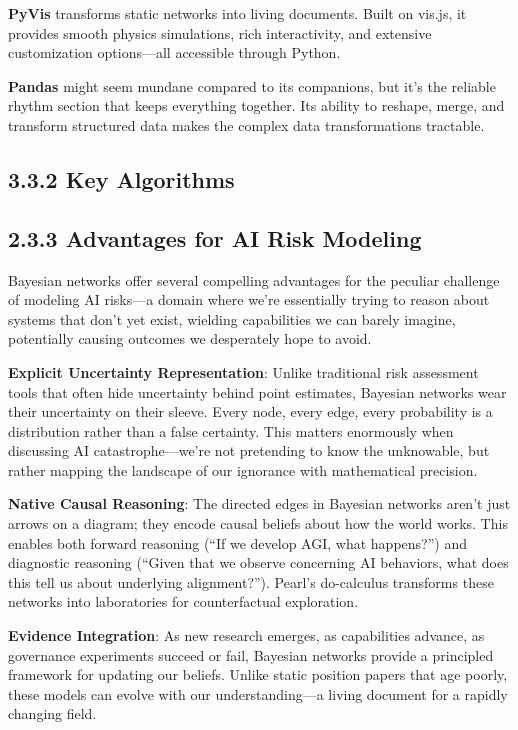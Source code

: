 \documentclass[
  11pt,
  letterpaper,
]{book}
\begin{document}
\textbf{PyVis} transforms static networks into living documents. Built
on vis.js, it provides smooth physics simulations, rich interactivity,
and extensive customization options---all accessible through Python.

\textbf{Pandas} might seem mundane compared to its companions, but it's
the reliable rhythm section that keeps everything together. Its ability
to reshape, merge, and transform structured data makes the complex data
transformations tractable.

\subsection{3.3.2 Key Algorithms}\label{sec-key-algorithms}

\subsection{2.3.3 Advantages for AI Risk
Modeling}\label{sec-modeling-advantages}

Bayesian networks offer several compelling advantages for the peculiar
challenge of modeling AI risks---a domain where we're essentially trying
to reason about systems that don't yet exist, wielding capabilities we
can barely imagine, potentially causing outcomes we desperately hope to
avoid.

\textbf{Explicit Uncertainty Representation}: Unlike traditional risk
assessment tools that often hide uncertainty behind point estimates,
Bayesian networks wear their uncertainty on their sleeve. Every node,
every edge, every probability is a distribution rather than a false
certainty. This matters enormously when discussing AI
catastrophe---we're not pretending to know the unknowable, but rather
mapping the landscape of our ignorance with mathematical precision.

\textbf{Native Causal Reasoning}: The directed edges in Bayesian
networks aren't just arrows on a diagram; they encode causal beliefs
about how the world works. This enables both forward reasoning (``If we
develop AGI, what happens?'') and diagnostic reasoning (``Given that we
observe concerning AI behaviors, what does this tell us about underlying
alignment?''). Pearl's do-calculus \textcite{pearl2009} transforms these
networks into laboratories for counterfactual exploration.

\textbf{Evidence Integration}: As new research emerges, as capabilities
advance, as governance experiments succeed or fail, Bayesian networks
provide a principled framework for updating our beliefs. Unlike static
position papers that age poorly, these models can evolve with our
understanding---a living document for a rapidly changing field.
\end{document}
